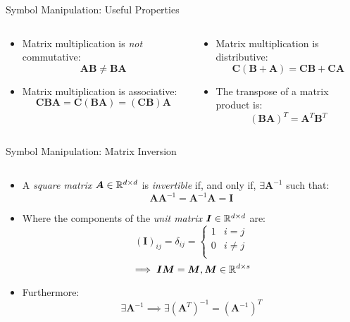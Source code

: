 \documentclass[mathserif, aspectratio=169]{beamer}
\begin{document}
\begin{frame}{Symbol Manipulation: Useful Properties}
	\vspace{-5mm}
	\begin{columns}[t]
		\begin{column}{0.5\textwidth}
			\begin{itemize}
				\item Matrix multiplication is \emph{not} commutative:
					\[ \bm{AB} \ne \bm{BA} \]
				\item Matrix multiplication is associative:
					\[ \bm{CBA} = \bm{C}(\bm{BA}) = (\bm{CB})\bm{A} \]
			\end{itemize}
		\end{column}
		\begin{column}{0.5\textwidth}
			\begin{itemize}
				\item Matrix multiplication is distributive:
					\[ \bm{C} (\bm{B} + \bm{A}) = \bm{CB} + \bm{CA} \]
				\item The transpose of a matrix product is:
					\[ (\bm{BA})^T = \bm{A}^T\bm{B}^T \]
			\end{itemize}
		\end{column}
	\end{columns}
	\vspace{-2mm}
\end{frame}

\begin{frame}{Symbol Manipulation: Matrix Inversion}
	\vspace{-2mm}
	\begin{columns}[t]
		\begin{column}{0.8\textwidth}
			\begin{itemize}
				\item A \emph{square matrix} $\bm{A} \in \mathbb{R}^{d\times d}$ is \emph{invertible} if, 
					and only if, $\exists\bm{A}^{-1}$ such that:
					\[ \bm{A}\bm{A}^{-1} = \bm{A}^{-1}\bm{A} = \bm{I} \]
				\item Where the components of the  \emph{unit matrix} $\bm{I} \in \mathbb{R}^{d\times d}$ are:
					\[ (\bm{I})_{ij} = \delta_{ij} = 
						\begin{cases}
							1 & i = j \\
							0 & i \ne j \\
						\end{cases}
					\]
					\[ \implies \bm{I}\bm{M} = \bm{M}, \bm{M} \in \mathbb{R}^{d\times s} \]
				\item Furthermore:
					\[ \exists\bm{A}^{-1}\implies\exists(\bm{A}^T)^{-1} = (\bm{A}^{-1})^T\]
			\end{itemize}
		\end{column}
	\end{columns}
\end{frame}
\end{document}
